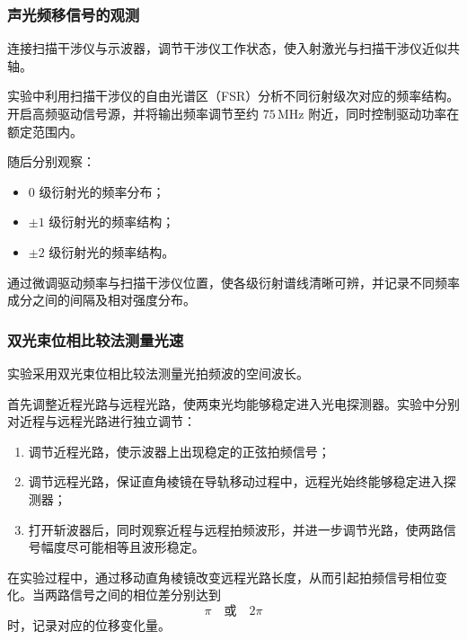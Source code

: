\documentclass[a4paper]{ctexart}
\begin{document}
\vspace{0.5em}

\subsubsection{声光频移信号的观测}

连接扫描干涉仪与示波器，调节干涉仪工作状态，使入射激光与扫描干涉仪近似共轴。

实验中利用扫描干涉仪的自由光谱区（FSR）分析不同衍射级次对应的频率结构。开启高频驱动信号源，并将输出频率调节至约 $75\,\mathrm{MHz}$ 附近，同时控制驱动功率在额定范围内。

随后分别观察：

\begin{itemize}
    \item $0$ 级衍射光的频率分布；
    \item $\pm1$ 级衍射光的频率结构；
    \item $\pm2$ 级衍射光的频率结构。
\end{itemize}

通过微调驱动频率与扫描干涉仪位置，使各级衍射谱线清晰可辨，并记录不同频率成分之间的间隔及相对强度分布。

\vspace{0.5em}

\subsubsection{双光束位相比较法测量光速}

实验采用双光束位相比较法测量光拍频波的空间波长。

首先调整近程光路与远程光路，使两束光均能够稳定进入光电探测器。实验中分别对近程与远程光路进行独立调节：

\begin{enumerate}
    \item 调节近程光路，使示波器上出现稳定的正弦拍频信号；
    
    \item 调节远程光路，保证直角棱镜在导轨移动过程中，远程光始终能够稳定进入探测器；
    
    \item 打开斩波器后，同时观察近程与远程拍频波形，并进一步调节光路，使两路信号幅度尽可能相等且波形稳定。
\end{enumerate}

在实验过程中，通过移动直角棱镜改变远程光路长度，从而引起拍频信号相位变化。当两路信号之间的相位差分别达到
\[
\pi \quad \text{或} \quad 2\pi
\]
时，记录对应的位移变化量。
\end{document}
